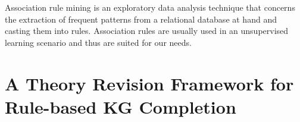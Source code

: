 Association rule mining is an exploratory data analysis technique that concerns the extraction of frequent patterns from a relational database at hand and casting them into rules. Association rules are usually used in an unsupervised learning scenario and thus are suited for our needs.

\section{A Theory Revision Framework for Rule-based KG Completion}\label{sec:rev_frame}


